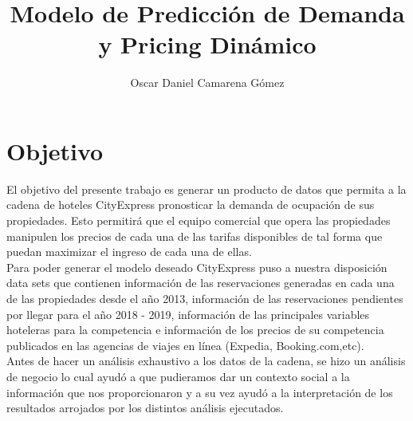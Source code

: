 \documentclass{article}\usepackage[]{graphicx}\usepackage[]{color}
\begin{document}
\title{\Huge Modelo de Predicción de Demanda y Pricing Dinámico}
\author{Oscar Daniel Camarena Gómez}
\date{}
\maketitle
{}
\newpage
\tableofcontents
\newpage
{}
\section{Objetivo}
El objetivo del presente trabajo es generar un producto de datos que permita a la cadena de hoteles CityExpress pronosticar la demanda de ocupación de sus propiedades. Esto permitirá que el equipo comercial que opera las propiedades manipulen los precios de cada una de las tarifas disponibles de tal forma que puedan maximizar el ingreso de cada una de ellas.
~ \\ 
Para poder generar el modelo deseado CityExpress puso a nuestra disposición data sets que contienen información de las reservaciones generadas en cada una de las propiedades desde el año 2013, información de las reservaciones pendientes por llegar para el año 2018 - 2019, información de las principales variables hoteleras para la competencia e información de los precios de su competencia publicados en las agencias de viajes en línea (Expedia, Booking.com,etc).
~\\ 
Antes de hacer un análisis exhaustivo a los datos de la cadena, se hizo un análisis de negocio lo cual ayudó a que pudieramos dar un contexto social a la información que nos proporcionaron y a su vez ayudó a la interpretación de los resultados arrojados por los distintos análisis ejecutados.
\end{document}

